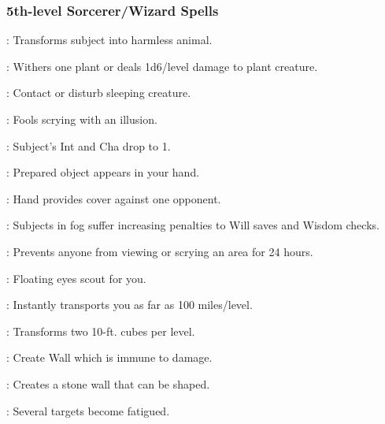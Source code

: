\subsubsection{5th-level Sorcerer/Wizard Spells}
\begin{list}{}{\leftmargin=1em} 
\item {}: Transforms subject into harmless animal.
\item {}: Withers one plant or deals 1d6/level damage to plant creature.
\item {}: Contact or disturb sleeping creature.
\item {}: Fools scrying with an illusion.
\item {}: Subject's Int and Cha drop to 1.
\item {}: Prepared object appears in your hand.
\item {}: Hand provides cover against one opponent.
\item {}: Subjects in fog suffer increasing penalties to Will saves and Wisdom checks.
\item {}: Prevents anyone from viewing or scrying an area for 24 hours.
\item {}: Floating eyes scout for you.
\item {}: Instantly transports you as far as 100 miles/level.
\item {}: Transforms two 10-ft. cubes per level.
\item {}: Create Wall which is immune to damage.
\item {}: Creates a stone wall that can be shaped.
\item {}: Several targets become fatigued.
\end{list}
